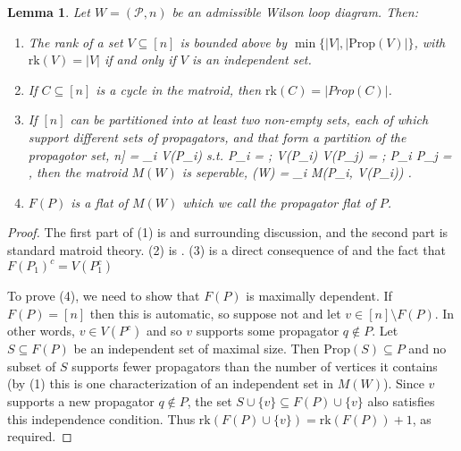 \documentclass[11pt]{article}
\newcommand{\rk}{\textrm{rk} }
\def\bas #1\eas{\begin{align*} #1 \end{align*}}
\newcommand{\cP}{\mathcal{P}}
\newcommand{\Prop}{\textrm{Prop}}
\newtheorem{lem}[thm]{Lemma}
\theoremstyle{remark}
\theoremstyle{definition}
\begin{document}
\begin{lem}\label{lem facts about WLD matroids}
Let $W = (\cP,n)$ be an admissible Wilson loop diagram. Then:
\begin{enumerate}
\item The rank of a set $V \subseteq [n]$ is bounded above by $\min\{|V|,|\Prop(V)|\}$, with $\rk(V) = |V|$ if and only if $V$ is an independent set.
\item If $C \subseteq [n]$ is a cycle in the matroid, then $\rk(C) = |Prop(C)|$.
\item If $[n]$ can be partitioned into at least two non-empty sets, each of which support different sets of propagators, and that form a partition of the propagotor set, \bas [n] = \sqcup_i V(P_i) \quad \textrm{s.t.} \quad \sqcup P_i = \cP; \quad V(P_i) \cap V(P_j) = \emptyset; \quad  P_i \cap P_j = \emptyset \;, \eas then the matroid $M(W)$ is seperable, \bas M(W) = \bigoplus_i M(P_i, V(P_i)) \;.\eas 
\item $F(P)$ is a flat of $M(W)$ which we call the \emph{propagator flat} of $P$.
\end{enumerate}
\end{lem}
\begin{proof}
The first part of (1) is \cite[Equation (9)]{wilsonloop} and surrounding discussion, and the second part is standard matroid theory. (2) is \cite[Lemma 3.27]{wilsonloop}. (3) is a direct consequence of \cite[Lemma 3.20]{wilsonloop} and the fact that $F(P_1)^c = V(P_1^c)$

To prove (4), we need to show that $F(P)$ is maximally dependent. If $F(P) = [n]$ then this is automatic, so suppose not and let $v \in [n] \setminus F(P)$. In other words, $v \in V(P^c)$ and so $v$ supports some propagator $q \not\in P$.  Let $S \subseteq F(P)$ be an independent set of maximal size. Then $\Prop(S) \subseteq P$ and no subset of $S$ supports fewer propagators than the number of vertices it contains (by (1) this is one characterization of an independent set in $M(W)$). Since $v$ supports a new propagator $q \not\in P$, the set $S \cup \{v\} \subseteq F(P) \cup\{v\}$ also satisfies this independence condition. Thus $\rk(F(P) \cup\{v\}) = \rk(F(P)) + 1$, as required.
\end{proof}
\end{document}
